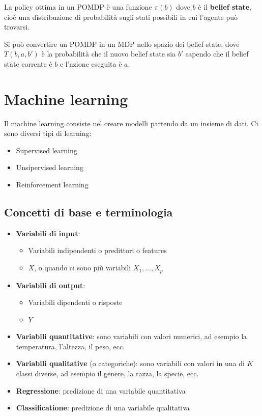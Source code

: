 \documentclass[a4paper]{article}
\begin{document}
\begin{theorem}
  La policy ottima in un POMDP è una funzione \( \pi(b) \) dove \( b \) è il
  \textbf{belief state}, cioè una distribuzione di probabilità sugli stati
  possibili in cui l'agente può trovarsi.
\end{theorem}

\noindent
Si può convertire un POMDP in un MDP nello spazio dei belief state, dove \( T(b, a, b') \) 
è la probabilità che il nuovo belief state sia \( b' \) sapendo che il belief state
corrente è \( b \) e l'azione eseguita è \( a \).

\section{Machine learning}
Il machine learning consiste nel creare modelli partendo da un insieme di dati. Ci
sono diversi tipi di learning:
\begin{itemize}
  \item Supervised learning
  \item Unsipervised learning
  \item Reinforcement learning
\end{itemize}

\subsection{Concetti di base e terminologia}
\begin{itemize}
  \item \textbf{Variabili di input}:
    \begin{itemize}
      \item Variabili indipendenti o predittori o features
      \item \( X \), o quando ci sono più variabili \( X_1, \ldots, X_p \) 
    \end{itemize}

  \item \textbf{Variabili di output}:
    \begin{itemize}
      \item Variabili dipendenti o risposte
      \item \( Y \)
    \end{itemize}

  \item \textbf{Variabili quantitative}: sono variabili con valori numerici, ad esempio
    la temperatura, l'altezza, il peso, ecc.

  \item \textbf{Variabili qualitative} (o categoriche): sono variabili con valori in
    una di \( K \) classi diverse, ad esempio il genere, la razza, la specie, ecc.

  \item \textbf{Regressione}: predizione di una variabile quantitativa
  \item \textbf{Classificatione}: predizione di una variabile qualitativa
\end{itemize}
\end{document}
